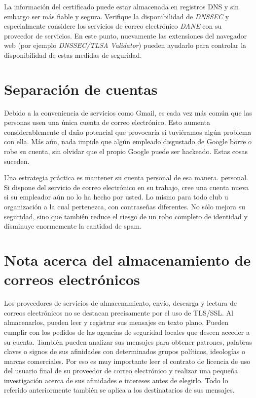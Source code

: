 \documentclass[10pt,a5paper,twoside,,]{book}
\begin{document}
La información del certificado puede estar almacenada en registros DNS y
sin embargo ser más fiable y segura. Verifique la disponibilidad de
\emph{DNSSEC} y especialmente considere los servicios de correo
electrónico \emph{DANE} con su proveedor de servicios. En este punto,
nuevamente las extensiones del navegador web (por ejemplo
\emph{DNSSEC/TLSA Validator}) pueden ayudarlo para controlar la
disponibilidad de estas medidas de seguridad.

\section{Separación de cuentas}\label{separaciuxf3n-de-cuentas}

Debido a la conveniencia de servicios como Gmail, es cada vez más común
que las personas usen una única cuenta de correo electrónico. Esto
aumenta considerablemente el daño potencial que provocaría si tuviéramos
algún problema con ella. Más aún, nada impide que algún empleado
disgustado de Google borre o robe su cuenta, sin olvidar que el propio
Google puede ser hackeado. Estas cosas suceden.

Una estrategia práctica es mantener su cuenta personal de esa manera.
personal. Si dispone del servicio de correo electrónico en su trabajo,
cree una cuenta nueva si su empleador aún no lo ha hecho por usted. Lo
mismo para todo club u organización a la cual pertenezca, con
contraseñas diferentes. No sólo mejora su seguridad, sino que también
reduce el riesgo de un robo completo de identidad y disminuye
enormemente la cantidad de spam.

\section{Nota acerca del almacenamiento de correos
electrónicos}\label{nota-acerca-del-almacenamiento-de-correos-electruxf3nicos}

Los proveedores de servicios de almacenamiento, envío, descarga y
lectura de correos electrónicos no se destacan precisamente por el uso
de TLS/SSL. Al almacenarlos, pueden leer y registrar sus mensajes en
texto plano. Pueden cumplir con los pedidos de las agencias de seguridad
locales que deseen acceder a su cuenta. También pueden analizar sus
mensajes para obtener patrones, palabras claves o signos de sus
afinidades con determinados grupos políticos, ideologías o marcas
comerciales. Por eso es muy importante leer el contrato de licencia de
uso del usuario final de su proveedor de correo electrónico y realizar
una pequeña investigación acerca de sus afinidades e intereses antes de
elegirlo. Todo lo referido anteriormente también se aplica a los
destinatarios de sus mensajes.
\end{document}
